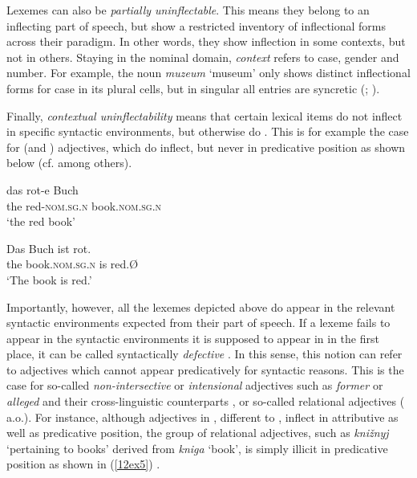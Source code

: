 \documentclass[output=paper,colorlinks,citecolor=brown]{langscibook}
\begin{document}
Lexemes can also be \textit{partially uninflectable}. This means they belong to an inflecting part of speech, but show a restricted inventory of inflectional forms across their paradigm. In other words, they show inflection in some contexts, but not in others. Staying in the nominal domain, \emph{context} refers to case, gender and number. For example, the  noun \emph{muzeum} `museum' only shows distinct inflectional forms for case in its plural cells, but in singular all entries are syncretic (\citealt[30]{baermanbrowncorbett2005}; \citealt[143]{spencer2020}).

Finally, \textit{contextual uninflectability} means that certain lexical items do not inflect in specific syntactic environments, but otherwise do \citep[149--150]{spencer2020}. This is for example the case for  (and ) adjectives, which do inflect, but never in predicative position as shown below (cf. \citealt{roehrs2008, zeijlstra2020} among others).

\begin{exe}
	\ex \label{12ex4}
	\begin{xlist}
		\ex 
		\gll das rot-e Buch \\
		the red-\textsc{nom.sg.n} book.\textsc{nom.sg.n} \\
		\trans `the red book’
		
		\ex 
		\gll Das Buch ist rot. \\
		the book.\textsc{nom.sg.n} is red.\textsc{Ø} \\
		\trans `The book is red.’
	\end{xlist}
\end{exe}

Importantly, however, all the lexemes depicted above do appear in the relevant syntactic environments expected from their part of speech. If a lexeme fails to appear in the syntactic environments it is supposed to appear in in the first place, it can be called syntactically \textit{defective} \citep[143]{spencer2020}. In this sense, this notion can refer to adjectives which cannot appear predicatively for syntactic reasons. This is the case for so-called \emph{non-intersective} or \emph{intensional} adjectives such as \emph{former} or \emph{alleged} and their cross-linguistic counterparts \citep{bolinger1967, kamppartee1995, larson1998}, or so-called relational adjectives (\citealt{levi1978, fabregas2007, bortolotto2016} a.o.). For instance, although adjectives in , different to , inflect in attributive as well as predicative position, the group of relational adjectives, such as \emph{kni\v{z}nyj} `pertaining to books' derived from \emph{kniga} `book', is simply illicit in predicative position as shown in (\ref{12ex5}) \citep{mezhevich2002, bailyn2002}.
\end{document}
